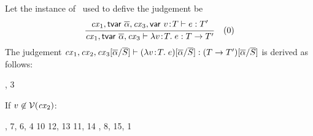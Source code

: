 \begin{bycase}
\Case{\Reabs}\\
Let the instance of \Reabs\ used to defive the judgement be
\[
\frac{\begin{array}{c}\mathit{cx}_1,\mathsf{tvar}\ \overline{\alpha},\mathit{cx}_3,\mathsf{var}\ v\!:\!T\vdash e:T'\end{array}}{\mathit{cx}_1,\mathsf{tvar}\ \overline{\alpha},\mathit{cx}_3\vdash\lambda v\!:\!T.\;e:T\to T'}\quad\mbox{(0)}
\]
The judgement
$\mathit{cx}_1,\mathit{cx}_2,\mathit{cx}_3[\overline{\alpha}/\overline{S}]\vdash(\lambda v\!:\!T.\;e)[\overline{\alpha}/\overline{S}]:(T\to T')[\overline{\alpha}/\overline{S}]$
is derived as follows:
\begin{derivation}
     {\indhyp, 3}
\end{derivation}
If $v\not\in\mathcal{V}(\mathit{cx}_2)$:
\begin{derivatioN}{5}
     {\Rcxvdec, 7, 6, 4}
     {10}
     {}
     {12, 13}
     {11, 14}
     {\indhyp, 8, 15, 1}
\end{derivatioN}
\end{bycase}
